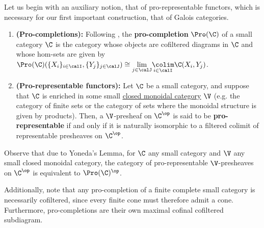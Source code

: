 Let us begin with an auxiliary notion, that of pro-representable functors, which is necessary for our first important construction, that of Galois categories.
            \begin{definition} \label{def: pro_representable_functors}
                \noindent
                \begin{enumerate}
                    \item \textbf{(Pro-completions):} Following \cite[Definition 2.1]{isaksen_2001_limits_and_colimits_in_pro_categories}, the \textbf{pro-completion} $\Pro(\C)$ of a small category $\C$ is the category whose objects are cofiltered diagrams in $\C$ and whose hom-sets are given by $\Pro(\C)(\{X_i\}_{i \in \calI}, \{Y_j\}_{j \in \calJ}) \cong \underset{j \in \calJ}{\lim} \underset{i \in \calI}{\colim} \C(X_i, Y_j)$.
                    \item \textbf{(Pro-representable functors):} Let $\C$ be a small category, and suppose that $\C$ is enriched in some small \href{http://nlab-pages.s3.us-east-2.amazonaws.com/nlab/show/closed+monoidal+category}{\underline{closed monoidal category}} $\V$ (e.g. the category of finite sets or the category of sets where the monoidal structure is given by products). Then, a $\V$-presheaf on $\C^{\op}$ is said to be \textbf{pro-representable} if and only if it is naturally isomorphic to a filtered colimit of representable presheaves on $\C^{\op}$.
                \end{enumerate}
            \end{definition}
            \begin{remark} \label{remark: pro_representable_functors_are_ind_objects}
                Observe that due to Yoneda's Lemma, for $\C$ any small category and $\V$ any small closed monoidal category, the category of pro-representable $\V$-presheaves on $\C^{\op}$ is equivalent to $\Pro(\C)^{\op}$.
                
                Additionally, note that any pro-completion of a finite complete small category is necessarily cofiltered, since every finite cone must therefore admit a cone. Furthermore, pro-completions are their own maximal cofinal cofiltered subdiagram.
            \end{remark}
            
